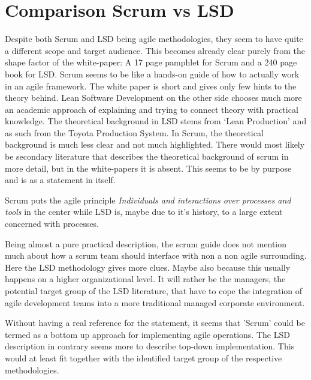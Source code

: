 \documentclass[a4paper,11pt,twoside]{article}
\begin{document}
\section{Comparison Scrum vs LSD}
Despite both Scrum and LSD being agile methodologies, they seem to have quite a different scope and target audience. This becomes already clear purely from the shape factor of the white-paper: A 17 page pamphlet for Scrum and a 240 page book for LSD. Scrum seems to be like a hands-on guide of how to actually work in an agile framework. The white paper is short and gives only few hints to the theory behind. Lean Software Development on the other side chooses much more an academic approach of explaining and trying to connect theory with practical knowledge. The theoretical background in LSD stems from `Lean Production' and as such from the Toyota Production System. In Scrum, the theoretical background is much less clear and not much highlighted. There would most likely be secondary literature that describes the theoretical background of scrum in more detail, but in the white-papers it is absent. This seems to be by purpose and is as a statement in itself.

Scrum puts the agile principle \textit{Individuals and interactions over processes and tools} in the center while LSD is, maybe due to it's history, to a large extent concerned with processes.

Being almost a pure practical description, the scrum guide does not mention much about how a scrum team should interface with non a non agile surrounding. Here the LSD methodology gives more clues. Maybe also because this usually happens on a higher organizational level. It will rather be the managers, the potential target group of the LSD literature, that have to cope the integration of agile development teams into a more traditional managed corporate environment.

Without having a real reference for the statement, it seems that 'Scrum' could be termed as a bottom up approach for implementing agile operations. The LSD description in contrary seems more to describe top-down implementation. This would at least fit together with the identified target group of the respective methodologies. 
\end{document}
